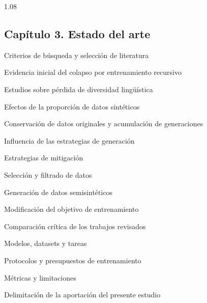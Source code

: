 \documentclass[12pt,letterpaper]{article}
\newcommand{\numerocap}{1}
\newcommand{\capitulo}[2]{\renewcommand{\numerocap}{#1}\Needspace{5\baselineskip}\subsection*{Capítulo #1. #2}}
\begin{document}
\begin{spacing}{1.08}
\capitulo{3}{Estado del arte}
\begin{apartados}
\item Criterios de búsqueda y selección de literatura
\item Evidencia inicial del colapso por entrenamiento recursivo
\item Estudios sobre pérdida de diversidad lingüística
\item Efectos de la proporción de datos sintéticos
\item Conservación de datos originales y acumulación de generaciones
\item Influencia de las estrategias de generación
\item Estrategias de mitigación
\begin{apartados}
\item Selección y filtrado de datos
\item Generación de datos semisintéticos
\item Modificación del objetivo de entrenamiento
\end{apartados}
\item Comparación crítica de los trabajos revisados
\begin{apartados}
\item Modelos, datasets y tareas
\item Protocolos y presupuestos de entrenamiento
\item Métricas y limitaciones
\end{apartados}
\item Delimitación de la aportación del presente estudio
\end{apartados}


\end{spacing}
\end{document}
